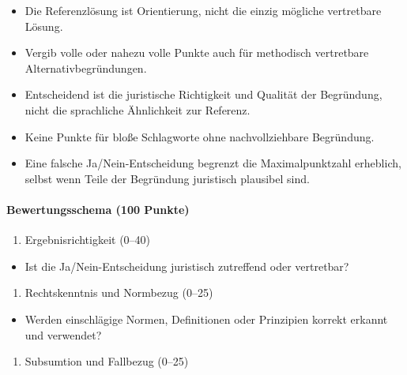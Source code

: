 \documentclass[11pt]{article}
\providecommand{\tightlist}{%
  \setlength{\itemsep}{0pt}\setlength{\parskip}{0pt}}
\begin{document}
\begin{itemize}
\tightlist
\item
  Die Referenzlösung ist Orientierung, nicht die einzig mögliche
  vertretbare Lösung.
\item
  Vergib volle oder nahezu volle Punkte auch für methodisch vertretbare
  Alternativbegründungen.
\item
  Entscheidend ist die juristische Richtigkeit und Qualität der
  Begründung, nicht die sprachliche Ähnlichkeit zur Referenz.
\item
  Keine Punkte für bloße Schlagworte ohne nachvollziehbare Begründung.
\item
  Eine falsche Ja/Nein-Entscheidung begrenzt die Maximalpunktzahl
  erheblich, selbst wenn Teile der Begründung juristisch plausibel sind.
\end{itemize}

\paragraph{Bewertungsschema (100
Punkte)}\label{bewertungsschema-100-punkte}

\begin{enumerate}
\def\labelenumi{\arabic{enumi}.}
\tightlist
\item
  Ergebnisrichtigkeit (0--40)
\end{enumerate}

\begin{itemize}
\tightlist
\item
  Ist die Ja/Nein-Entscheidung juristisch zutreffend oder vertretbar?
\end{itemize}

\begin{enumerate}
\def\labelenumi{\arabic{enumi}.}
\tightlist
\item
  Rechtskenntnis und Normbezug (0--25)
\end{enumerate}

\begin{itemize}
\tightlist
\item
  Werden einschlägige Normen, Definitionen oder Prinzipien korrekt
  erkannt und verwendet?
\end{itemize}

\begin{enumerate}
\def\labelenumi{\arabic{enumi}.}
\tightlist
\item
  Subsumtion und Fallbezug (0--25)
\end{enumerate}
\end{document}
